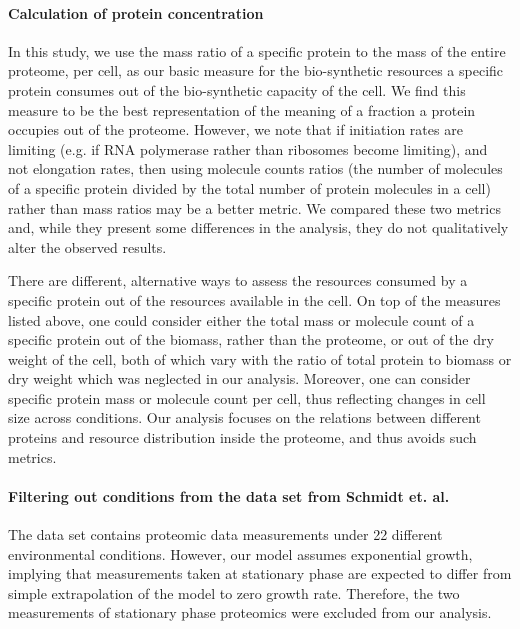 \documentclass[10pt,letterpaper]{article}
\begin{document}
\paragraph{Calculation of protein concentration}

In this study, we use the mass ratio of a specific protein to the mass of the entire proteome, per cell, as our basic measure for the bio-synthetic resources a specific protein consumes out of the bio-synthetic capacity of the cell.
We find this measure to be the best representation of the meaning of a fraction a protein occupies out of the proteome.
However, we note that if initiation rates are limiting (e.g. if RNA polymerase rather than ribosomes become limiting), and not elongation rates, then using molecule counts ratios (the number of molecules of a specific protein divided by the total number of protein molecules in a cell) rather than mass ratios may be a better metric.
We compared these two metrics and, while they present some differences in the analysis, they do not qualitatively alter the observed results.

There are different, alternative ways to assess the resources consumed by a specific protein out of the resources available in the cell.
On top of the measures listed above, one could consider either the total mass or molecule count of a specific protein out of the biomass, rather than the proteome, or out of the dry weight of the cell, both of which vary with the ratio of total protein to biomass or dry weight which was neglected in our analysis.
Moreover, one can consider specific protein mass or molecule count per cell, thus reflecting changes in cell size across conditions.
Our analysis focuses on the relations between different proteins and resource distribution inside the proteome, and thus avoids such metrics.

\paragraph{Filtering out conditions from the data set from Schmidt et. al.}


The \cite{Schmidt2015} data set contains proteomic data measurements under 22 different environmental conditions.
However, our model assumes exponential growth, implying that measurements taken at stationary phase are expected to differ from simple extrapolation of the model to zero growth rate.
Therefore, the two measurements of stationary phase proteomics were excluded from our analysis.
\end{document}
